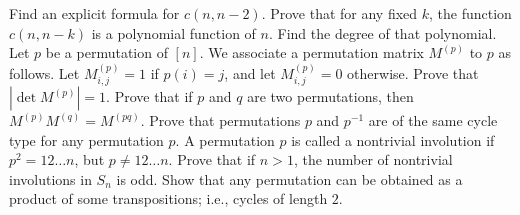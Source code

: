 \begin{chapterendexercises}
  \exercise[recommended] Find an explicit formula for $c(n, n - 2)$.
  \exercise Prove that for any fixed $k$, the function $c(n, n - k)$ is a
    polynomial function of $n$. Find the degree of that polynomial.
  \exercise Let $p$ be a permutation of $[n]$. We associate a permutation matrix
    $M^{(p)}$ to $p$ as follows. Let $M^{(p)}_{i, j} = 1$ if $p(i) = j$, and let
    $M^{(p)}_{i, j} = 0$ otherwise. Prove that $|\det M^{(p)}| = 1$.
  \exercise Prove that if $p$ and $q$ are two permutations, then
    $M^{(p)} M^{(q)} = M^{(pq)}$.
  \exercise[recommended] Prove that permutations $p$ and $p^{-1}$ are of the
    same cycle type for any permutation $p$.
  \exercise A permutation $p$ is called a nontrivial involution if
    $p^2 = 1 2 \dots n$, but $p \neq 1 2 \dots n$. Prove that if $n > 1$, the
    number of nontrivial involutions in $S_n$ is odd.
  \exercise Show that any permutation can be obtained as a product of some
    transpositions; i.e., cycles of length $2$.
\end{chapterendexercises}
